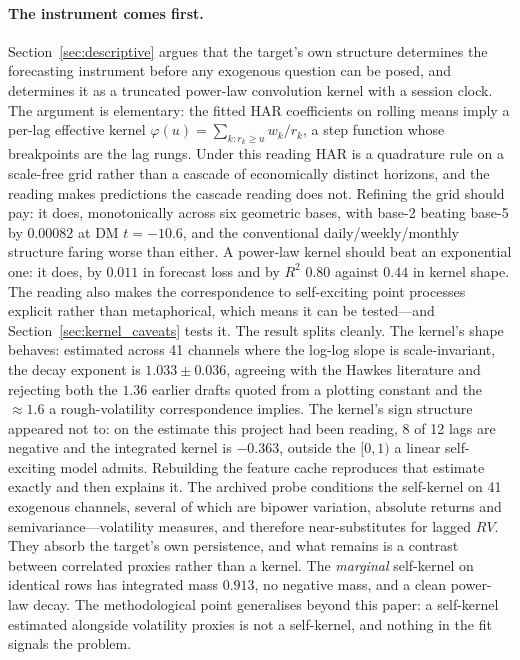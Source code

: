\paragraph{The instrument comes first.} Section~\ref{sec:descriptive} argues that the target's own structure determines the forecasting instrument before any exogenous question can be posed, and determines it as a truncated power-law convolution kernel with a session clock. The argument is elementary: the fitted HAR coefficients on rolling means imply a per-lag effective kernel $\varphi(u) = \sum_{k: r_k \ge u} w_k / r_k$, a step function whose breakpoints are the lag rungs. Under this reading HAR is a quadrature rule on a scale-free grid rather than a cascade of economically distinct horizons, and the reading makes predictions the cascade reading does not. Refining the grid should pay: it does, monotonically across six geometric bases, with base-2 beating base-5 by $0.00082$ at DM $t = -10.6$, and the conventional daily/weekly/monthly structure faring worse than either. A power-law kernel should beat an exponential one: it does, by $0.011$ in forecast loss and by $R^2$ $0.80$ against $0.44$ in kernel shape. The reading also makes the correspondence to self-exciting point processes \citep{Hawkes1971, BacryMastromatteoMuzy2015} explicit rather than metaphorical, which means it can be tested---and Section~\ref{sec:kernel_caveats} tests it. The result splits cleanly. The kernel's shape behaves: estimated across 41 channels where the log-log slope is scale-invariant, the decay exponent is $1.033 \pm 0.036$, agreeing with the Hawkes literature and rejecting both the $1.36$ earlier drafts quoted from a plotting constant and the $\approx 1.6$ a rough-volatility correspondence implies. The kernel's sign structure appeared not to: on the estimate this project had been reading, 8 of 12 lags are negative and the integrated kernel is $-0.363$, outside the $[0,1)$ a linear self-exciting model admits. Rebuilding the feature cache reproduces that estimate exactly and then explains it. The archived probe conditions the self-kernel on 41 exogenous channels, several of which are bipower variation, absolute returns and semivariance---volatility measures, and therefore near-substitutes for lagged $RV$. They absorb the target's own persistence, and what remains is a contrast between correlated proxies rather than a kernel. The \emph{marginal} self-kernel on identical rows has integrated mass $0.913$, no negative mass, and a clean power-law decay. The methodological point generalises beyond this paper: a self-kernel estimated alongside volatility proxies is not a self-kernel, and nothing in the fit signals the problem.


